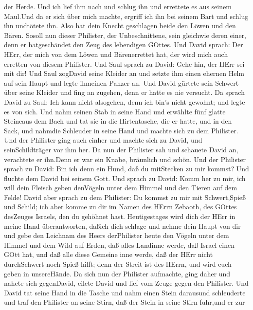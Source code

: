 der Herde.  Und ich lief ihm nach und schlug ihn und
errettete es aus seinem Maul.Und da er sich über mich machte, ergriff
ich ihn bei seinem Bart und schlug ihn undtötete ihn.  Also
hat dein Knecht geschlagen beide den Löwen und den Bären. Sosoll nun
dieser Philister, der Unbeschnittene, sein gleichwie deren einer, denn
er hatgeschändet den Zeug des lebendigen GOttes.  Und David
sprach: Der HErr, der mich von dem Löwen und Bärenerrettet hat, der wird
mich auch erretten von diesem Philister.  Und Saul sprach
zu David: Gehe hin, der HErr sei mit dir! Und Saul zogDavid seine
Kleider an und setzte ihm einen ehernen Helm auf sein Haupt und legte
ihmeinen Panzer an.  Und David gürtete sein Schwert über
seine Kleider und fing an zugehen, denn er hatte es nie versucht. Da
sprach David zu Saul: Ich kann nicht alsogehen, denn ich bin's nicht
gewohnt; und legte es von sich.  Und nahm seinen Stab in
seine Hand und erwählte fünf glatte Steineaus dem Bach und tat sie in
die Hirtentasche, die er hatte, und in den Sack, und nahmdie Schleuder
in seine Hand und machte sich zu dem Philister.  Und der
Philister ging auch einher und machte sich zu David, und
seinSchildträger vor ihm her.  Da nun der Philister sah und
schauete David an, verachtete er ihn.Denn er war ein Knabe, bräunlich
und schön.  Und der Philister sprach zu David: Bin ich denn
ein Hund, daß du mitStecken zu mir kommst? Und fluchte dem David bei
seinem Gott.  Und sprach zu David: Komm her zu mir, ich
will dein Fleisch geben denVögeln unter dem Himmel und den Tieren auf
dem Felde!  David aber sprach zu dem Philister: Du kommst
zu mir mit Schwert,Spieß und Schild; ich aber komme zu dir im Namen des
HErrn Zebaoth, des GOttes desZeuges Israels, den du gehöhnet hast.
 Heutigestages wird dich der HErr in meine Hand
überantworten, daßich dich schlage und nehme dein Haupt von dir und gebe
den Leichnam des Heers derPhilister heute den Vögeln unter dem Himmel
und dem Wild auf Erden, daß alles Landinne werde, daß Israel einen GOtt
hat,  und daß alle diese Gemeine inne werde, daß der HErr
nicht durchSchwert noch Spieß hilft; denn der Streit ist des HErrn, und
wird euch geben in unsereHände.  Da sich nun der Philister
aufmachte, ging daher und nahete sich gegenDavid, eilete David und lief
vom Zeuge gegen den Philister.  Und David tat seine Hand in
die Tasche und nahm einen Stein darausund schleuderte und traf den
Philister an seine Stirn, daß der Stein in seine Stirn fuhr,und er zur
